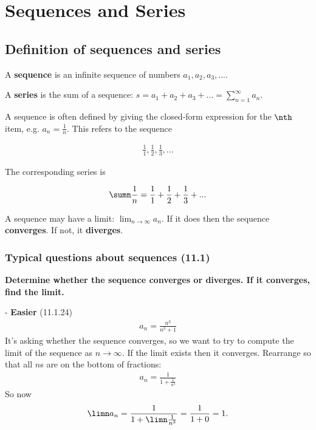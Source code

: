 \section{Sequences and Series}

\subsection{Definition of sequences and series}

A \textbf{sequence} is an infinite sequence of numbers $a_1, a_2, a_3, ...$.

A \textbf{series} is the sum of a sequence: $s = a_1 + a_2 + a_3 + ... = \sum_{n=1}^\infty a_n$.

A sequence is often defined by giving the closed-form expression for the $\nth$ item, e.g. $a_n = \frac{1}{n}$. This refers to the sequence

\begin{align*}
  \frac{1}{1}, \frac{1}{2}, \frac{1}{3}, ...
\end{align*}

The corresponding series is

\begin{align*}
  \sumn \frac{1}{n} = \frac{1}{1} + \frac{1}{2} + \frac{1}{3} + ...
\end{align*}

A sequence may have a limit: $\lim_{n \rightarrow \infty} a_n$. If it does then the sequence \textbf{converges}. If not, it \textbf{diverges}.

\subsubsection{Typical questions about sequences (11.1)}


\textbf{Determine whether the sequence converges or diverges. If it converges, find the limit.}

- \textbf{Easier} (11.1.24)
\begin{align*}
  a_n = \frac{n^3}{n^3 + 1}
\end{align*}
It's asking whether the sequence converges, so we want to try to compute the limit of the sequence as $n \rightarrow \infty$. If the limit exists then it converges. Rearrange so that all $n$s are on the bottom of fractions:
\begin{align*}
  a_n = \frac{1}{1 + \frac{1}{n^3}}
\end{align*}
So now
\begin{align*}
  \limn a_n = \frac{1}{1 + \limn\frac{1}{n^3}} = \frac{1}{1 + 0} = 1.
\end{align*}

